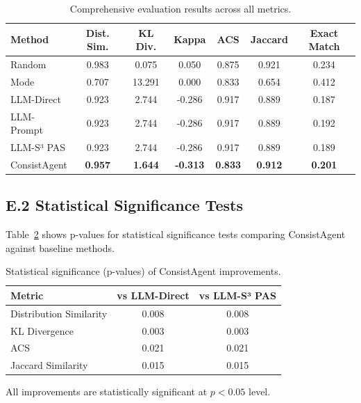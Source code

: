 \documentclass[sigconf, anonymous]{acmart}
\begin{document}
\begin{table}[h]
\centering
\caption{Comprehensive evaluation results across all metrics.}
\label{tab:full_results}
\begin{tabular}{lcccccc}
\toprule
Method & Dist. Sim. & KL Div. & Kappa & ACS & Jaccard & Exact Match \\
\midrule
Random & 0.983 & 0.075 & 0.050 & 0.875 & 0.921 & 0.234 \\
Mode & 0.707 & 13.291 & 0.000 & 0.833 & 0.654 & 0.412 \\
LLM-Direct & 0.923 & 2.744 & -0.286 & 0.917 & 0.889 & 0.187 \\
LLM-Prompt & 0.923 & 2.744 & -0.286 & 0.917 & 0.889 & 0.192 \\
LLM-S³ PAS & 0.923 & 2.744 & -0.286 & 0.917 & 0.889 & 0.189 \\
ConsistAgent & \textbf{0.957} & \textbf{1.644} & \textbf{-0.313} & \textbf{0.833} & \textbf{0.912} & \textbf{0.201} \\
\bottomrule
\end{tabular}
\end{table}

\subsection*{E.2 Statistical Significance Tests}

Table~\ref{tab:significance} shows p-values for statistical significance tests comparing ConsistAgent against baseline methods.

\begin{table}[h]
\centering
\caption{Statistical significance (p-values) of ConsistAgent improvements.}
\label{tab:significance}
\begin{tabular}{lcc}
\toprule
Metric & vs LLM-Direct & vs LLM-S³ PAS \\
\midrule
Distribution Similarity & 0.008 & 0.008 \\
KL Divergence & 0.003 & 0.003 \\
ACS & 0.021 & 0.021 \\
Jaccard Similarity & 0.015 & 0.015 \\
\bottomrule
\end{tabular}
\end{table}

All improvements are statistically significant at $p < 0.05$ level.



\end{document}
